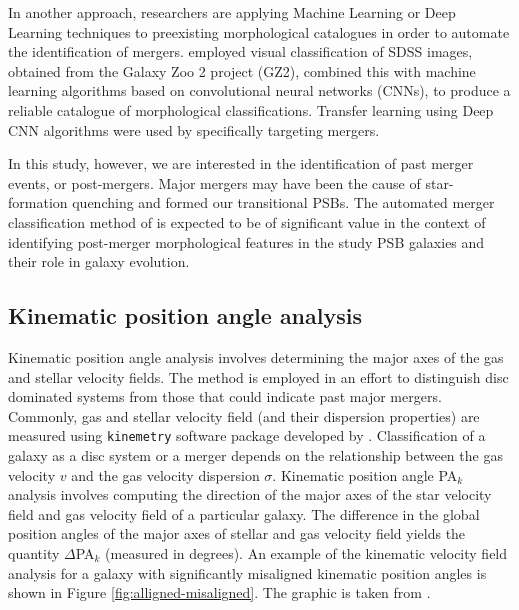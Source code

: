 In another approach, researchers are applying Machine Learning or Deep Learning techniques to preexisting morphological catalogues in order to automate the identification of mergers. \citet{2018MNRAS.476.3661D} employed visual classification of SDSS images, obtained from the Galaxy Zoo 2 project (GZ2), combined this with machine learning algorithms based on convolutional neural networks (CNNs), to produce a reliable catalogue of  morphological classifications. Transfer learning using Deep CNN algorithms were used by \citet{2018MNRAS.479..415A} specifically targeting mergers. 

In this study, however, we are interested in the identification of past merger events, or post-mergers. Major mergers may have been the cause of star-formation quenching and formed our transitional PSBs. The automated merger classification method of  \cite{2019DDA....5020304N} is expected to be of significant value in the context of identifying post-merger morphological features in the study PSB galaxies and their role in galaxy evolution. 


\subsection{Kinematic position angle analysis}
Kinematic position angle analysis involves determining the major axes of the gas and stellar velocity fields. The method is employed in an effort to distinguish disc dominated systems from those that could indicate past major mergers. Commonly, gas and stellar velocity field (and their dispersion properties) are measured using \texttt{kinemetry} software package developed by \citet{2006MNRAS.366..787K}. Classification of a galaxy as a disc system or a merger depends on the relationship between the gas velocity $v$ and the gas velocity dispersion $\sigma$. Kinematic position angle PA$_{k}$ analysis involves computing the direction of the major axes of the star velocity field and gas velocity field of a particular galaxy. The difference in the global position angles of the major axes of stellar and gas velocity field yields the quantity $\Delta$PA$_{k}$ (measured in degrees). An example of the kinematic velocity field analysis for a galaxy with significantly misaligned kinematic position angles is shown in Figure \ref{fig:alligned-misaligned}. The graphic is taken from \citet{2019MNRAS.483..172D}.

